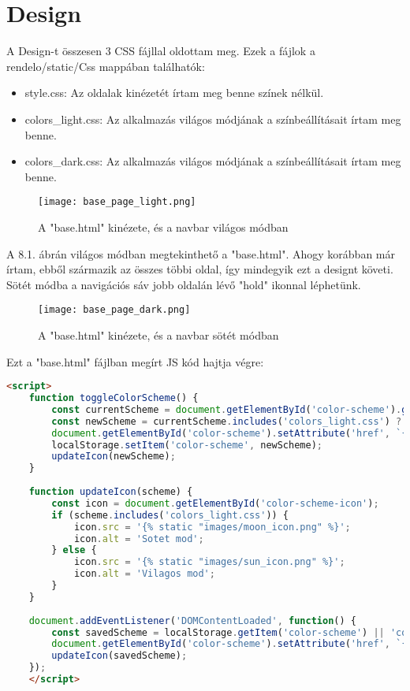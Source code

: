\chapter{Design}
\label{chap:fejezet8}

A Design-t összesen 3 CSS fájllal oldottam meg. Ezek a fájlok a rendelo/static/Css mappában találhatók:

\begin{itemize}
	\item style.css: Az oldalak kinézetét írtam meg benne színek nélkül.
	\item colors\_light.css: Az alkalmazás világos módjának a színbeállításait írtam meg benne.
	\item colors\_dark.css: Az alkalmazás világos módjának a színbeállításait írtam meg benne.
\end{itemize}

\begin{figure}[H]
	\caption{A "base.html" kinézete, és a navbar világos módban}
	\label{fig:lightmode}
	\centering
	\texttt{[image: base\_page\_light.png]}
\end{figure}

A 8.1. ábrán világos módban megtekinthető a "base.html". Ahogy korábban már írtam, ebből származik az összes többi oldal, így mindegyik ezt a designt követi. Sötét módba a navigációs sáv jobb oldalán lévő "hold" ikonnal léphetünk.

\begin{figure}[H]
	\caption{A "base.html" kinézete, és a navbar sötét módban}
	\label{fig:darkmode}
	\centering
	\texttt{[image: base\_page\_dark.png]}
\end{figure}

Ezt a "base.html" fájlban megírt JS kód hajtja végre:

\begin{lstlisting}[caption={A színösszeállítások között váltó JS kód},label={lst:stringstartswith2}, language={HTML}]
	<script>
	function toggleColorScheme() {
		const currentScheme = document.getElementById('color-scheme').getAttribute('href');
		const newScheme = currentScheme.includes('colors_light.css') ? 'colors_dark.css' : 'colors_light.css';
		document.getElementById('color-scheme').setAttribute('href', `{% static 'css/' %}` + newScheme);
		localStorage.setItem('color-scheme', newScheme);
		updateIcon(newScheme);
	}
	
	function updateIcon(scheme) {
		const icon = document.getElementById('color-scheme-icon');
		if (scheme.includes('colors_light.css')) {
			icon.src = '{% static "images/moon_icon.png" %}';
			icon.alt = 'Sotet mod';
		} else {
			icon.src = '{% static "images/sun_icon.png" %}';
			icon.alt = 'Vilagos mod';
		}
	}
	
	document.addEventListener('DOMContentLoaded', function() {
		const savedScheme = localStorage.getItem('color-scheme') || 'colors_light.css';
		document.getElementById('color-scheme').setAttribute('href', `{% static 'css/' %}` + savedScheme);
		updateIcon(savedScheme);
	});
	</script>
	
\end{lstlisting}


